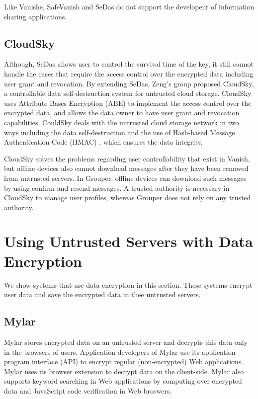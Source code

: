 \documentclass[a4paper,11pt]{report}
\begin{document}
Like Vanishe, SafeVanish and SeDas do not support the developent of information sharing applications.

\subsection{CloudSky}

Although, SeDas allows user to control the survival time of the key, it still cannot handle the cases that require the access control over the encrypted data including user grant and revocation.
By extending SeDas, Zeng's group proposed CloudSky\cite{zeng2015cloudsky}, a controllable data self-destruction system for untrusted cloud storage. 
CloudSky uses Attribute Bases Encryption (ABE) to implement the access control over the encrypted data, and allows the data owner to have user grant and revocation capabilities.
CouldSky deals with the untrusted cloud storage network in two ways including the data self-destruction and the use of Hash-based Message Authentication Code (HMAC) \cite{bellare1997hmac}, which ensures the data integrity.

CloudSky solves the problems regarding user controllability that exist in Vanish, but offline devices also cannot download messages after they have been removed from untrusted servers.
In Grouper, offline devices can download such messages by using confirm and resend messages.
A trusted authority is necessary in CloudSky to manage user profiles, whereas Grouper does not rely on any trusted authority.

\section{Using Untrusted Servers with Data Encryption}

We show systems that use data encryption in this section.
These systems encrypt user data and save the encrypted data in thee untrusted servers.

\subsection{Mylar}
Mylar\cite{popa2014building} stores encrypted data on an untrusted server and decrypts this data only in the browsers of users. 
Application developers of Mylar use its application program interface (API) to encrypt regular (non-encrypted) Web applications. 
Mylar uses its browser extension to decrypt data on the client-side. 
Mylar also supports keyword searching in Web applications by computing over encrypted data and JavaScript code verification in Web broswers.
\end{document}
